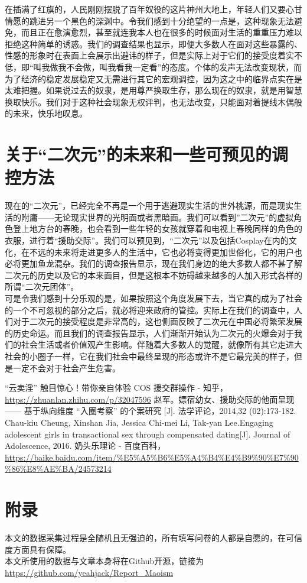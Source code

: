\documentclass[a4paper]{article}
\begin{document}
	在插满了红旗的，人民刚刚摆脱了百年奴役的这片神州大地上，年轻人们又要心甘情愿的跳进另一个黑色的深渊中。令我们感到十分绝望的一点是，这种现象无法避免，而且正在愈演愈烈，甚至就连我本人也在很多的时候面对生活的重重压力难以拒绝这种简单的诱惑。我们的调查结果也显示，即便大多数人在面对这些暴露的、性感的形象时在表面上会展示出避讳的样子，但是实际上对于它们的接受度着实不低，即“叫我做我不会做，叫我看我一定看”的态度。个体的发声无法改变现状，而为了经济的稳定发展稳定又无需进行其它的宏观调控，因为这之中的临界点实在是太难把握。如果说过去的奴隶，是用尊严换取生存，那么现在的奴隶，就是用智慧换取快乐。我们对于这种社会现象无权评判，也无法改变，只能面对着提线木偶般的未来，快乐地叹息。
	
	
	\clearpage
	\section{关于“二次元”的未来和一些可预见的调控方法}
	现在的“二次元”，已经完全不再是一个用于逃避现实生活的世外桃源，而是现实生活的附庸——无论现实世界的光明面或者黑暗面。我们可以看到”二次元”的虚拟角色登上地方台的春晚，也会看到一些年轻的女孩就穿着和电视上春晚同样的角色的衣服，进行着“援助交际”。我们可以预见到，“二次元”以及包括Cosplay在内的文化，在不远的未来将走进更多人的生活中，它也必将变得更加世俗化，它的用户也必将更加鱼龙混杂。我们的调查报告显示，现在我们身边的绝大多数人都不甚了解二次元的历史以及它的本来面目，但是这根本不妨碍越来越多的人加入形式各样的所谓“二次元团体”。\\
	
	可是令我们感到十分乐观的是，如果按照这个角度发展下去，当它真的成为了社会的一个不可忽视的部分之后，就必将迎来政府的管控。实际上在我们的调查中，人们对于二次元的接受程度是非常高的，这也侧面反映了二次元在中国必将繁荣发展的历史命运。而且我们的调查报告显示，人们渐渐开始认为二次元的火爆会对于我们的社会生活或者价值观产生影响。伴随着大多数人的觉醒，就像所有其它走进大社会的小圈子一样，它在我们社会中最终呈现的形态或许不是它最完美的样子，但是一定不会对于社会产生危害。
	
	\vskip40pt
	\begin{thebibliography}{4}
		 “云卖淫” 触目惊心！带你亲自体验 COS 援交群操作 - 知乎， \url{https://zhuanlan.zhihu.com/p/32047596}
		 赵军。嫖宿幼女、援助交际的他面呈现 —— 基于纵向维度 “入圈考察” 的个案研究 [J]. 法学评论，2014,32 (02):173-182.
		 Chau-kiu Cheung, Xinshan Jia, Jessica Chi-mei Li, Tak-yan Lee.Engaging adolescent girls in transactional sex through compensated dating[J]. Journal of Adolescence, 2016.
		 奶头乐理论 - 百度百科， \url{https://baike.baidu.com/item/\%E5\%A5\%B6\%E5\%A4\%B4\%E4\%B9\%90\%E7\%90\%86\%E8\%AE\%BA/24573214}
	\end{thebibliography}
	
	\section{附录}
	本文的数据采集过程是全随机且无强迫的，所有填写问卷的人都是自愿的，在可信度方面具有保障。\\
	
	本文所使用的数据与文章本身将在Github开源，链接为\url{https://github.com/yeahjack/Report_Maoism}
\end{document}
